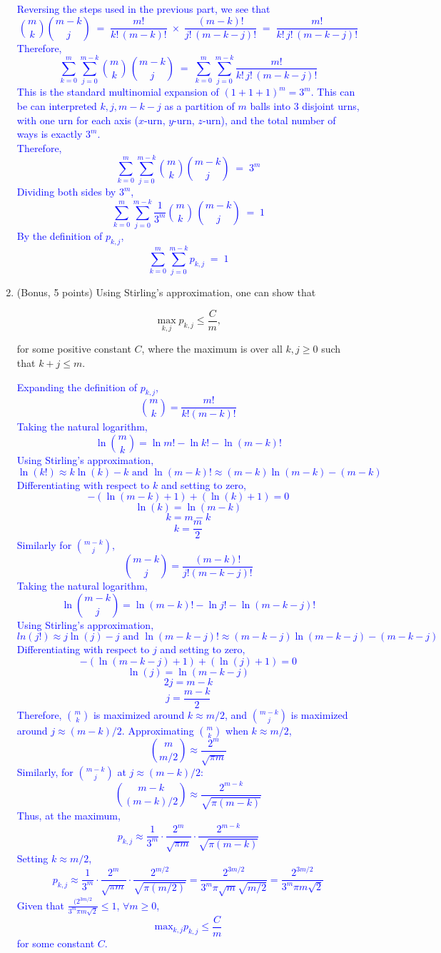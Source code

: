 \documentclass{article}
\begin{document}
\begin{enumerate}[label=(\alph*)]
\textcolor{blue}{Reversing the steps used in the previous part, we see that 
\[
\binom{m}{k} \binom{m-k}{j}
\;=\;
\frac{m!}{k!\,(m-k)!}
\;\times\;
\frac{(m-k)!}{j!\,(m-k-j)!}
\;=\;
\frac{m!}{k!\,j!\,(m-k-j)!}
\]
Therefore,
\[
\sum_{k=0}^{m} \sum_{j=0}^{m-k} 
\binom{m}{k}\,\binom{m-k}{j}
\;=\;
\sum_{k=0}^m \sum_{j=0}^{m-k} \frac{m!}{k!\,j!\,(m-k-j)!}
\]
This is the standard multinomial expansion of $(1+1+1)^m = 3^m$. 
This can be can interpreted $k,j,m-k-j$ as a partition of $m$ balls into 3 disjoint urns, with one urn for each axis ($x$-urn, $y$-urn, $z$-urn), and the total number of ways is exactly $3^m$. \\  Therefore,
\[
\sum_{k=0}^{m} \sum_{j=0}^{m-k}
\binom{m}{k}\binom{m-k}{j}
\;=\;
3^m
\]
Dividing both sides by $3^m$,
\[
\sum_{k=0}^{m} \sum_{j=0}^{m-k} 
\frac{1}{3^m} \binom{m}{k}\,\binom{m-k}{j}
\;=\;
1
\]
By the definition of $p_{k,j}$,
\[
\sum_{k=0}^{m} \sum_{j=0}^{m-k} p_{k,j} 
\;=\;
1
\]
}

\item (Bonus, 5 points) Using Stirling’s approximation, one can show that

\[
\max_{k,j} p_{k,j} \leq \frac{C}{m},
\]

for some positive constant $C$, where the maximum is over all $k,j \geq 0$ such that $k+j \leq m$.

\textcolor{blue}{
    Expanding the definition of $p_{k,j}$,
    $$\binom{m}{k}=\frac{m!}{k!(m-k)!}$$
    Taking the natural logarithm,
    $$\ln \binom{m}{k}=\ln m!-\ln k!-\ln (m-k)!$$
    Using Stirling's approximation,
    $$\ln(k!) \approx k \ln(k) - k \text{ and } \ln(m-k)! \approx (m-k)\ln(m-k) - (m-k)$$
    Differentiating with respect to $k$ and setting to zero,
    $$-(\ln(m-k)+1)+(\ln(k)+1)=0$$
    $$\ln(k)=\ln(m-k)$$
    $$k=m-k$$
    $$k=\frac{m}{2}$$
    Similarly for $\binom{m-k}{j}$,
    $$\binom{m-k}{j}=\frac{(m-k)!}{j!(m-k-j)!}$$
    Taking the natural logarithm,
    $$\ln \binom{m-k}{j}=\ln (m-k)!-\ln j!-\ln (m-k-j)!$$
    Using Stirling's approximation,
    $$ln(j!) \approx j \ln(j) - j \text{ and } \ln(m-k-j)! \approx (m-k-j)\ln(m-k-j) - (m-k-j)$$
    Differentiating with respect to $j$ and setting to zero,
    $$-(\ln(m-k-j)+1)+(\ln(j)+1)=0$$
    $$\ln(j)=\ln(m-k-j)$$
    $$2j=m-k$$
    $$j=\frac{m-k}{2}$$
    Therefore, $\binom{m}{k}$ is maximized around $k \approx m/2$, and $\binom{m-k}{j}$ is maximized around $j \approx (m-k)/2$. 
    Approximating $\binom{m}{k}$ when $k \approx m/2$,
\[
\binom{m}{m/2} \approx \frac{2^m}{\sqrt{\pi m}}
\]
Similarly, for \(\binom{m-k}{j}\) at \(j \approx (m-k)/2\):
\[
\binom{m-k}{(m-k)/2} \approx \frac{2^{m-k}}{\sqrt{\pi (m-k)}}
\]
Thus, at the maximum,
\[
p_{k,j} \approx \frac{1}{3^m} \cdot \frac{2^m}{\sqrt{\pi m}} \cdot \frac{2^{m-k}}{\sqrt{\pi (m-k)}}
\]
Setting \(k \approx m/2\),
\[
p_{k,j} \approx \frac{1}{3^m} \cdot \frac{2^m}{\sqrt{\pi m}} \cdot \frac{2^{m/2}}{\sqrt{\pi (m/2)}}
= \frac{2^{3m/2}}{3^m \pi \sqrt{m} \sqrt{m/2}}
= \frac{2^{3m/2}}{3^m \pi m \sqrt{2}}
\]
Given that $\frac{(2^{3m/2}}{3^m\pi m\sqrt{2}}\leq 1$, $\forall m \geq 0$,
\[
    \text{max}_{k,j}p_{k,j} \leq \frac{C}{m}
\]
for some constant \(C\).
}


\end{enumerate}
\end{document}
